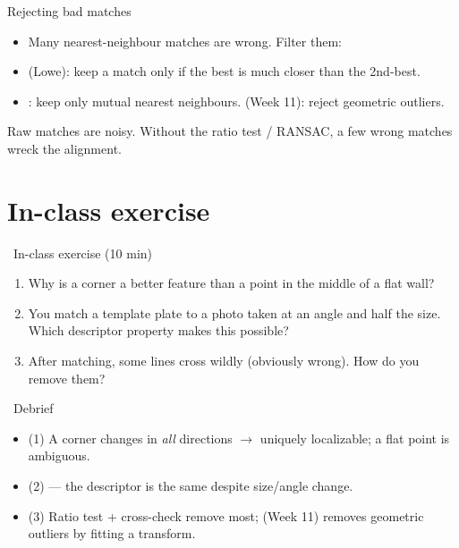 \documentclass[10pt,aspectratio=169]{beamer}
\begin{document}
\begin{frame}{Rejecting bad matches}
  \begin{itemize}
    \item Many nearest-neighbour matches are wrong. Filter them:
    \item {} (Lowe): keep a match only if the best is much closer than the 2nd-best.
    \item {}: keep only mutual nearest neighbours.  (Week 11): reject geometric outliers.
  \end{itemize}
  \begin{badbox}
    Raw matches are noisy. Without the ratio test / RANSAC, a few wrong matches wreck the alignment.
  \end{badbox}
\end{frame}

\section{In-class exercise}

\begin{frame}{\faPen~In-class exercise (10 min)}
  \begin{infobox}
  \end{infobox}
  \begin{enumerate}
    \item Why is a corner a better feature than a point in the middle of a flat wall?
    \item You match a template plate to a photo taken at an angle and half the size. Which
          descriptor property makes this possible?
    \item After matching, some lines cross wildly (obviously wrong). How do you remove them?
  \end{enumerate}
\end{frame}

\begin{frame}{\faPen~Debrief}
  \begin{itemize}
    \item (1) A corner changes in \emph{all} directions $\rightarrow$ uniquely localizable; a flat point is ambiguous.
    \item (2)  — the descriptor is the same despite size/angle change.
    \item (3) Ratio test + cross-check remove most;  (Week 11) removes geometric outliers by fitting a transform.
  \end{itemize}
\end{frame}
\end{document}
